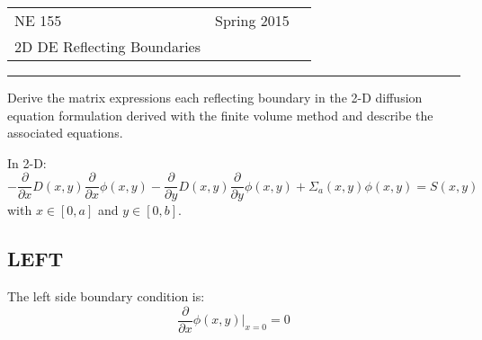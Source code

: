 \documentclass[12pt]{article}
\begin{document}
 

\begin{flushright}
\begin{tabular}{p{5in} r l}
NE 155 & Spring 2015 \\
2D DE Reflecting Boundaries
\end{tabular}
\end{flushright}
\rule[1ex]{\textwidth}{.1pt}

%
%
%


Derive the matrix expressions each reflecting boundary in the 2-D diffusion equation formulation derived with the finite volume method and describe the associated equations. 

In 2-D:
\[-\frac{\partial}{\partial x}D(x,y)\frac{\partial}{\partial x} \phi(x,y) -\frac{\partial}{\partial y}D(x,y)\frac{\partial}{\partial y} \phi(x,y) + \Sigma_a(x,y) \phi(x,y) = S(x,y)\]
%
with $x \in [0,a]$ and $y \in [0,b]$.


\subsection*{LEFT}
The left side boundary condition is:
\[\frac{\partial }{\partial x} \phi(x,y)\big|_{x=0} = 0\]
\end{document}
